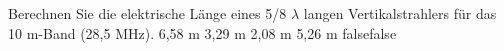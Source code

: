     {Berechnen Sie die elektrische Länge eines 5/8 $\lambda$ langen Vertikalstrahlers für das 10 m-Band (28,5 MHz).}
    {6,58 m}
    {3,29 m}
    {2,08 m}
    {5,26 m}
    {false}{false}